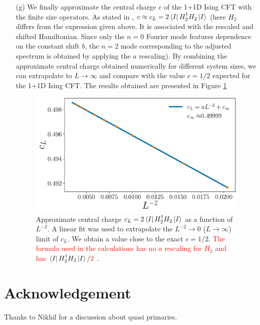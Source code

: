\documentclass[10pt, a4paper]{article}
\begin{document}
{\begin{enumerate}
  \item[(g)]  We finally approximate the central charge $c$ of the 1+1D Ising CFT with the finite size operators. As stated in \cite{spinchain}, $c \approx c_L = 2 \bra{I}H_2^{\dagger} H_2 \ket{I}$ (here $H_2$ differs from the expression given above. It is associated with the rescaled and shifted Hamiltonian. Since only the $n=0$ Fourier mode features dependence on the constant shift $b$, the $n=2$ mode corresponding to the adjusted spectrum is obtained by applying the $a$ rescaling). By combining the approximate central charge obtained numerically for different system sizes, we can extrapolate to $L\to \infty$ and compare with the value $c = 1/2$ expected for the 1+1D Ising CFT. The results obtained are presented in Figure \ref{central_c} 
  \begin{figure}
    \centering
    \includegraphics[scale=0.5]{central_charge_fit.pdf}
    \caption{Approximate central charge $c_L = 2 \bra{I}H_2^{\dagger} H_2 \ket{I}$ as a function of $L^{-2}$. A linear fit was used to extrapolate the $L^{-2} \to 0$ ($L\to \infty$) limit of $c_L$. We obtain a value close to the exact $c=1/2$. \textcolor{red}{The formula used in the calculations has no $a$ rescaling for $H_2$ and has $\bra{I}H_2^{\dagger} H_2 \ket{I}/\textcolor{red}{2}$} \label{central_c}.}
  \end{figure}
\end{enumerate}


\section{Acknowledgement}
Thanks to Nikhil for a discussion about quasi primaries. 
}

\makereferences


\end{document}
